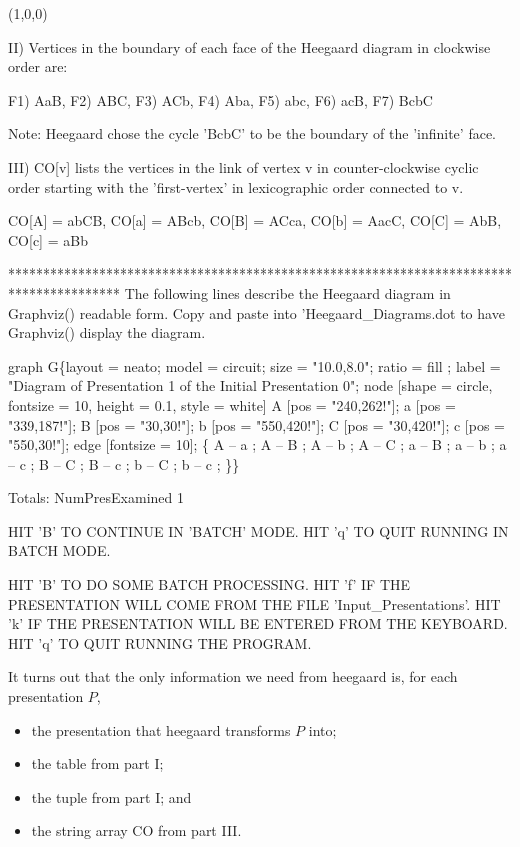 \documentclass{article}%
\theoremstyle{plain}
\theoremstyle{plain}
\theoremstyle{definition}
\numberwithin{equation}{section}
\begin{document}
(1,0,0)

II) Vertices in the boundary of each face of the Heegaard diagram in clockwise order are:

F1) AaB, F2) ABC, F3) ACb, F4) Aba, F5) abc, F6) acB, F7) BcbC

Note: Heegaard chose the cycle 'BcbC' to be the boundary of the 'infinite' face.

III) CO[v] lists the vertices in the link of vertex v in counter-clockwise cyclic order starting with the 'first-vertex' in lexicographic order connected to v.

CO[A] = abCB, CO[a] = ABcb, CO[B] = ACca, CO[b] = AacC, CO[C] = AbB, CO[c] = aBb

****************************************************************************************
The following lines describe the Heegaard diagram in Graphviz() readable form.
Copy and paste into 'Heegaard_Diagrams.dot to have Graphviz() display the diagram.

 graph G\{layout = neato; model = circuit; size = "10.0,8.0"; ratio = fill ;
 label = "Diagram of Presentation 1 of the Initial Presentation 0"; 
node [shape = circle, fontsize = 10, height = 0.1, style = white] 
A [pos = "240,262!"]; a [pos = "339,187!"]; B [pos = "30,30!"]; b [pos = "550,420!"]; C [pos = "30,420!"]; c [pos = "550,30!"]; 
 edge [fontsize = 10]; \{ A -- a ; A -- B ; A -- b ; A -- C ; a -- B ; a -- b ; a -- c ; B -- C ; B -- c ; b -- C ; b -- c ; \}\}




 Totals: NumPresExamined 1

HIT 'B' TO CONTINUE IN 'BATCH' MODE. HIT 'q' TO QUIT RUNNING IN BATCH MODE.

HIT 'B' TO DO SOME BATCH PROCESSING.
HIT 'f' IF THE PRESENTATION WILL COME FROM THE FILE 'Input_Presentations'.
HIT 'k' IF THE PRESENTATION WILL BE ENTERED FROM THE KEYBOARD.
HIT 'q' TO QUIT RUNNING THE PROGRAM.



\nwendcode{}\nwdocspar
It turns out that the only information we need from
{\Tt{}heegaard\nwendquote} is, for each presentation $P$,
\begin{itemize}
\item the presentation that {\Tt{}heegaard\nwendquote} transforms $P$ into;
\item the table from part I;
\item the tuple from part I; and
\item the string array {\Tt{}CO\nwendquote} from part III.
\end{itemize}
\end{document}

